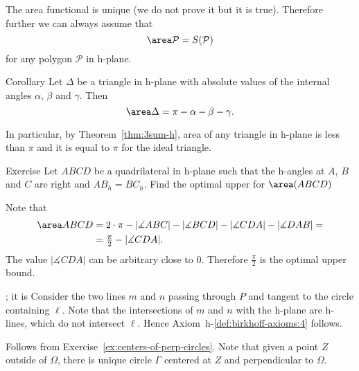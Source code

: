 {The area functional is unique (we do not prove it but it is true).
Therefore further we can always assume that
$$\area\mathcal{P}= S(\mathcal{P})$$
for any polygon $\mathcal{P}$ in h-plane.


\begin{thm}{Corollary}\label{cor:area-h-trig}
Let $\Delta$ be a triangle in h-plane with absolute values of the internal angles $\alpha$, $\beta$ and $\gamma$.
Then 
$$\area\Delta=\pi-\alpha-\beta-\gamma.$$

In particular, by Theorem~\ref{thm:3sum-h},
area of any triangle in h-plane is less than $\pi$ and it is equal to $\pi$ for the ideal triangle.
\end{thm}

\begin{thm}{Exercise}\label{ex:area-sup}
Let $ABCD$ be a quadrilateral in h-plane such that the h-angles at $A$, $B$ and $C$ are right and $AB_h=BC_h$.
 Find the optimal upper for $\area(ABCD)$
\end{thm}

















Note that 
\begin{align*}
\area ABCD
&=
2\cdot\pi-|\measuredangle ABC|-|\measuredangle BCD|-|\measuredangle CDA|-|\measuredangle DAB|=
\\
&=\tfrac{\pi}2-|\measuredangle CDA|.
\end{align*}
The value $|\measuredangle CDA|$ can be arbitrary close to $0$.
Therefore $\tfrac{\pi}2$ is the optimal upper bound.









;
it is
Consider the two lines $m$ and $n$ passing through $P$ and tangent to the circle containing $\ell$.
Note that the intersections of $m$ and $n$ with the h-plane are h-lines, which do not intersect $\ell$.
Hence Axiom~h-$\!$\ref{def:birkhoff-axioms:4} follows.










Follows from Exercise~\ref{ex:centers-of-perp-circles}.
Note that given a point $Z$ outside of $\Omega$,
there is unique circle $\Gamma$ centered at $Z$ and perpendicular to $\Omega$.

}
